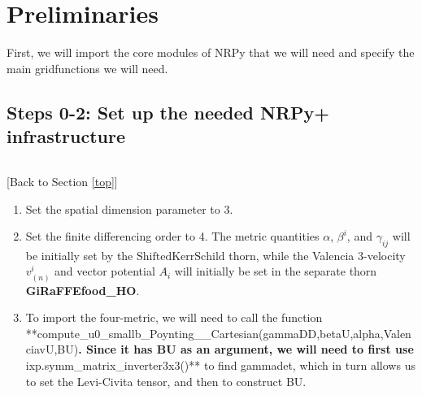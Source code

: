 \documentclass[landscape,letterpaper,10pt,english]{article}
\providecommand{\tightlist}{%
      \setlength{\itemsep}{0pt}\setlength{\parskip}{0pt}}
\begin{document}
    \section{Preliminaries}\label{preliminaries}

First, we will import the core modules of NRPy that we will need and
specify the main gridfunctions we will need.

\subsection{Steps 0-2: Set up the needed NRPy+
infrastructure}\label{steps-0-2-set-up-the-needed-nrpy-infrastructure}

\[\label{steps0to2}\]

{[}Back to Section \ref{top}{]}

\begin{enumerate}
\def\labelenumi{\arabic{enumi}.}
\setcounter{enumi}{-1}
\tightlist
\item
  Set the spatial dimension parameter to 3.
\item
  Set the finite differencing order to 4. The metric quantities
  \(\alpha\), \(\beta^i\), and \(\gamma_{ij}\) will be initially set by
  the \(\text{ShiftedKerrSchild}\) thorn, while the Valencia 3-velocity
  \(v^i_{(n)}\) and vector potential \(A_i\) will initially be set in
  the separate thorn \textbf{GiRaFFEfood\_HO}.
\item
  To import the four-metric, we will need to call the function
  **compute\_u0\_smallb\_Poynting\_\_Cartesian(gammaDD,betaU,alpha,ValenciavU,BU)\textbf{.
  Since it has BU as an argument, we will need to first use
  }ixp.symm\_matrix\_inverter3x3()** to find gammadet, which in turn
  allows us to set the Levi-Civita tensor, and then to construct BU.
\end{enumerate}
\end{document}
